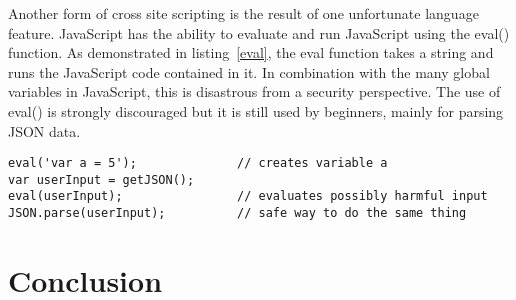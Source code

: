 \documentclass{report}
\begin{document}
Another form of cross site scripting is the result of one unfortunate language feature. JavaScript has the ability to evaluate and run JavaScript using the eval() function. As demonstrated in listing~\ref{eval}, the eval function takes a string and runs the JavaScript code contained in it. In combination with the many global variables in JavaScript, this is disastrous from a security perspective. The use of eval() is strongly discouraged but it is still used by beginners, mainly for parsing JSON data.
\begin{lstlisting}[caption={Insertion of malicious script on the client side, eval().},label={eval}]
eval('var a = 5');              // creates variable a
var userInput = getJSON();
eval(userInput);                // evaluates possibly harmful input
JSON.parse(userInput);          // safe way to do the same thing
\end{lstlisting}


\section{Conclusion}
\end{document}
